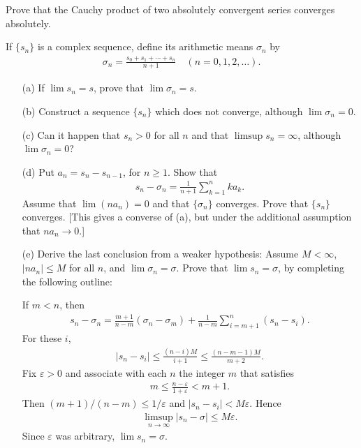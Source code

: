   \begin{exercise}[Rudin 3.13]
    Prove that the Cauchy product of two absolutely convergent series converges absolutely.
  \end{exercise}
  \begin{solution}
    
  \end{solution}

  \begin{exercise}[Rudin 3.14]
    If $\{s_n\}$ is a complex sequence, define its arithmetic means $\sigma_n$ by
    \begin{align*}
      \sigma_n = \frac{s_0 + s_1 + \cdots + s_n}{n+1} \quad (n = 0, 1, 2, \ldots).
    \end{align*}
    \begin{enumerate} 
      \item[(a)] If $\lim s_n = s$, prove that $\lim \sigma_n = s$.
      \item[(b)] Construct a sequence $\{s_n\}$ which does not converge, although $\lim \sigma_n = 0$.
      \item[(c)] Can it happen that $s_n > 0$ for all $n$ and that $\limsup s_n = \infty$, although $\lim \sigma_n = 0$?
      \item[(d)] Put $a_n = s_n - s_{n-1}$, for $n \geq 1$. Show that
      \begin{align*}
        s_n - \sigma_n = \frac{1}{n+1} \sum_{k=1}^{n} ka_k.
      \end{align*}
      Assume that $\lim (na_n) = 0$ and that $\{\sigma_n\}$ converges. Prove that $\{s_n\}$ converges. [This gives a converse of (a), but under the additional assumption that $na_n \to 0$.]
      \item[(e)] Derive the last conclusion from a weaker hypothesis: Assume $M < \infty$, $|na_n| \leq M$ for all $n$, and $\lim \sigma_n = \sigma$. Prove that $\lim s_n = \sigma$, by completing the following outline:
      
      If $m < n$, then
      \begin{align*}
        s_n - \sigma_n = \frac{m+1}{n-m}(\sigma_n - \sigma_m) + \frac{1}{n-m} \sum_{i=m+1}^{n} (s_n - s_i).
      \end{align*}
      For these $i$,
      \begin{align*}
        |s_n - s_i| \leq \frac{(n-i)M}{i+1} \leq \frac{(n-m-1)M}{m+2}.
      \end{align*}
      Fix $\varepsilon > 0$ and associate with each $n$ the integer $m$ that satisfies
      \begin{align*}
        m \leq \frac{n-\varepsilon}{1+\varepsilon} < m+1.
      \end{align*}
      Then $(m+1)/(n-m) \leq 1/\varepsilon$ and $|s_n - s_i| < M\varepsilon$. Hence
      \begin{align*}
        \limsup_{n \to \infty} |s_n - \sigma| \leq M\varepsilon.
      \end{align*}
      Since $\varepsilon$ was arbitrary, $\lim s_n = \sigma$.
    \end{enumerate}
  \end{exercise}
